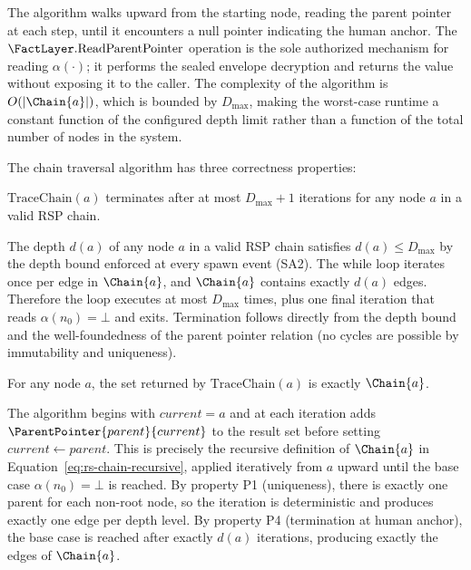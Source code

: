 The algorithm walks upward from the starting node, reading the parent pointer at each step, until it encounters a null pointer indicating the human anchor. The $\FactLayer.\text{ReadParentPointer}$ operation is the sole authorized mechanism for reading $\alpha(\cdot)$; it performs the sealed envelope decryption and returns the value without exposing it to the caller. The complexity of the algorithm is $O(|\Chain{a}|)$, which is bounded by $D_{\max}$, making the worst-case runtime a constant function of the configured depth limit rather than a function of the total number of nodes in the system.

The chain traversal algorithm has three correctness properties:

\begin{prop}[Termination]
\label{prop:rs-chain-traversal-termination}
$\mathrm{TraceChain}(a)$ terminates after at most $D_{\max} + 1$ iterations for any node $a$ in a valid RSP chain.
\end{prop}

\begin{prf}
The depth $d(a)$ of any node $a$ in a valid RSP chain satisfies $d(a) \leq D_{\max}$ by the depth bound enforced at every spawn event (SA2). The while loop iterates once per edge in $\Chain{a}$, and $\Chain{a}$ contains exactly $d(a)$ edges. Therefore the loop executes at most $D_{\max}$ times, plus one final iteration that reads $\alpha(n_0) = \bot$ and exits. Termination follows directly from the depth bound and the well-foundedness of the parent pointer relation (no cycles are possible by immutability and uniqueness).
\end{prf}

\begin{prop}[Correctness]
\label{prop:rs-chain-traversal-correctness}
For any node $a$, the set returned by $\mathrm{TraceChain}(a)$ is exactly $\Chain{a}$.
\end{prop}

\begin{prf}
The algorithm begins with $current = a$ and at each iteration adds $\ParentPointer{parent}{current}$ to the result set before setting $current \leftarrow parent$. This is precisely the recursive definition of $\Chain{a}$ in Equation~\ref{eq:rs-chain-recursive}, applied iteratively from $a$ upward until the base case $\alpha(n_0) = \bot$ is reached. By property P1 (uniqueness), there is exactly one parent for each non-root node, so the iteration is deterministic and produces exactly one edge per depth level. By property P4 (termination at human anchor), the base case is reached after exactly $d(a)$ iterations, producing exactly the edges of $\Chain{a}$.
\end{prf}


